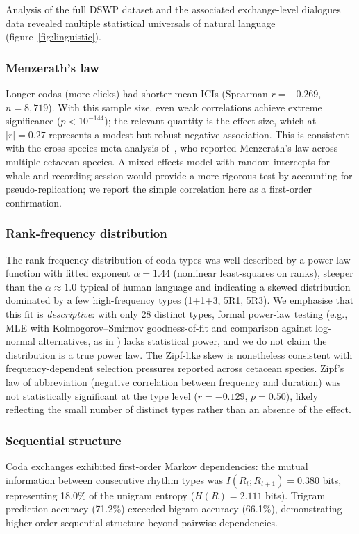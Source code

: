 \documentclass[11pt,a4paper]{article}
\begin{document}
Analysis of the full DSWP dataset and the associated exchange-level
dialogues data revealed multiple statistical universals of natural
language (figure~\ref{fig:linguistic}).

\subsubsection*{Menzerath's law}
Longer codas (more clicks) had shorter mean ICIs (Spearman $r = -0.269$,
$n = 8{,}719$). With this sample size, even weak correlations achieve
extreme significance ($p < 10^{-144}$); the relevant quantity is the
effect size, which at $|r| = 0.27$ represents a modest but robust
negative association. This is consistent with the cross-species
meta-analysis of~\citet{Youngblood2025}, who reported Menzerath's law
across multiple cetacean species. A mixed-effects model with random
intercepts for whale and recording session would provide a more rigorous
test by accounting for pseudo-replication; we report the simple
correlation here as a first-order confirmation.

\subsubsection*{Rank-frequency distribution}
The rank-frequency distribution of coda types was well-described by a
power-law function with fitted exponent $\alpha = 1.44$ (nonlinear
least-squares on ranks), steeper than the $\alpha \approx 1.0$ typical
of human language and indicating a skewed distribution dominated by a
few high-frequency types (1+1+3, 5R1, 5R3). We emphasise that this fit
is \emph{descriptive}: with only 28 distinct types, formal power-law
testing (e.g., MLE with Kolmogorov--Smirnov goodness-of-fit and
comparison against log-normal alternatives, as in
\citealt{Youngblood2025}) lacks statistical power, and we do not claim
the distribution is a true power law. The Zipf-like skew is nonetheless
consistent with frequency-dependent selection pressures reported
across cetacean species. Zipf's law of abbreviation (negative
correlation between frequency and duration) was not statistically
significant at the type level ($r = -0.129$, $p = 0.50$), likely
reflecting the small number of distinct types rather than an absence of
the effect.

\subsubsection*{Sequential structure}
Coda exchanges exhibited first-order Markov dependencies: the mutual
information between consecutive rhythm types was $I(R_t; R_{t+1}) =
0.380$ bits, representing 18.0\% of the unigram entropy
($H(R) = 2.111$ bits). Trigram prediction accuracy (71.2\%) exceeded
bigram accuracy (66.1\%), demonstrating higher-order sequential structure
beyond pairwise dependencies.
\end{document}
